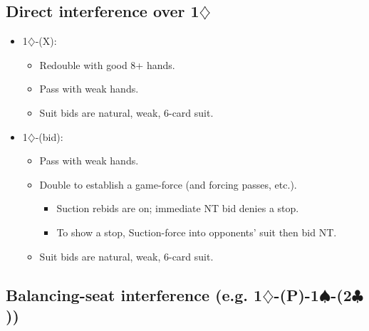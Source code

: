 \documentclass[a4paper,12pt]{article}
\begin{document}
\subsection{Direct interference over 1$\diamondsuit$}

\begin{itemize}
\item 1$\diamondsuit$-(X):
	\begin{itemize}
   \item Redouble with good 8+ hands.
   \item Pass with weak hands.
   \item Suit bids are natural, weak, 6-card suit.
	\end{itemize}
\item 1$\diamondsuit$-(bid):
	\begin{itemize}
   \item Pass with weak hands.
   \item Double to establish a game-force (and forcing passes, etc.).
		\begin{itemize}
      \item Suction rebids are on; immediate NT bid denies a stop.
      \item To show a stop, Suction-force into opponents' suit then bid NT.
		\end{itemize}
   \item Suit bids are natural, weak, 6-card suit.
	\end{itemize}
\end{itemize}

\subsection{Balancing-seat interference (e.g. 1$\diamondsuit$-(P)-1$\spadesuit$-(2$\clubsuit$))}
\end{document}
